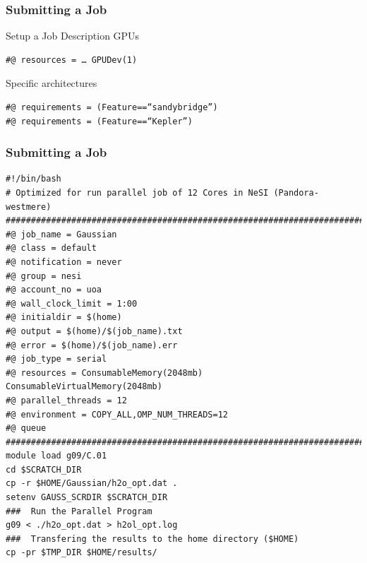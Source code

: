 \documentclass{beamer}
\begin{document}
\begin{frame}
  \frametitle{Submitting a Job}
      \begin{block}{Setup a Job Description}
GPUs
\begin{verbatim}
#@ resources = … GPUDev(1)
\end{verbatim}

Specific architectures
\begin{verbatim}
#@ requirements = (Feature==“sandybridge”)
#@ requirements = (Feature==“Kepler”)
\end{verbatim}
  \end{block}
\end{frame}


\begin{frame}
  \frametitle{Submitting a Job}
\begin{verbatim}
#!/bin/bash 
# Optimized for run parallel job of 12 Cores in NeSI (Pandora-westmere)
##########################################################################
#@ job_name = Gaussian
#@ class = default
#@ notification = never
#@ group = nesi
#@ account_no = uoa
#@ wall_clock_limit = 1:00
#@ initialdir = $(home)
#@ output = $(home)/$(job_name).txt
#@ error = $(home)/$(job_name).err
#@ job_type = serial
#@ resources = ConsumableMemory(2048mb) ConsumableVirtualMemory(2048mb)
#@ parallel_threads = 12
#@ environment = COPY_ALL,OMP_NUM_THREADS=12
#@ queue
########################################################################## 
module load g09/C.01
cd $SCRATCH_DIR
cp -r $HOME/Gaussian/h2o_opt.dat . 
setenv GAUSS_SCRDIR $SCRATCH_DIR
###  Run the Parallel Program
g09 < ./h2o_opt.dat > h2ol_opt.log
###  Transfering the results to the home directory ($HOME) 
cp -pr $TMP_DIR $HOME/results/
\end{verbatim}
\end{frame}
\end{document}
